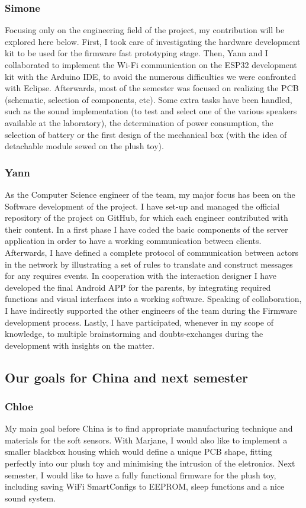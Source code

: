 \subsubsection{Simone}
Focusing only on the engineering field of the project, my contribution will be explored here below. First, I took care of investigating the hardware development kit to be used for the firmware fast prototyping stage. Then, Yann and I collaborated to implement the Wi-Fi communication on the ESP32 development kit with the Arduino IDE, to avoid the numerous difficulties we were confronted with Eclipse. Afterwards, most of the semester was focused on realizing the PCB (schematic, selection of components, etc). Some extra tasks have been handled, such as the sound implementation (to test and select one of the various speakers available at the laboratory), the determination of power consumption, the selection of battery or the first design of the mechanical box (with the idea of detachable module sewed on the plush toy). 

\subsubsection{Yann}
As the Computer Science engineer of the team, my major focus has been on the Software development of the project. I have set-up and managed the official repository of the project on GitHub, for which each engineer contributed with their content. In a first phase I have coded the basic components of the server application in order to have a working communication between clients. Afterwards, I have defined a complete protocol of communication between actors in the network by illustrating a set of rules to translate and construct messages for any requires events. In cooperation with the interaction designer I have developed the final Android APP for the parents, by integrating required functions and visual interfaces into a working software. Speaking of collaboration, I have indirectly supported the other engineers of the team during the Firmware development process. Lastly, I have participated, whenever in my scope of knowledge, to multiple brainstorming and doubts-exchanges during the development with insights on the matter. 
    
\subsection{Our goals for China and next semester}
    \subsubsection{Chloe}
My main goal before China is to find appropriate manufacturing technique and materials for the soft sensors. With Marjane, I would also like to implement a smaller blackbox housing which would define a unique PCB shape, fitting perfectly into our plush toy and minimising the intrusion of the eletronics.
\newline Next semester, I would like to have a fully functional firmware for the plush toy, including saving WiFi SmartConfigs to EEPROM, sleep functions and a nice sound system.

